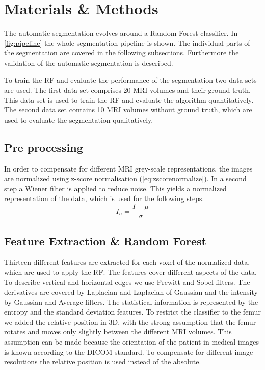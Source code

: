 \section{Materials \& Methods}
The automatic segmentation evolves around a Random Forest classifier. In \autoref{fig:pipeline} the whole segmentation pipeline is shown. The individual parts of the segmentation are covered in the following subsections. Furthermore the validation of the automatic segmentation is described.

To train the RF and evaluate the performance of the segmentation two data sets are used. The first data set comprises 20 MRI volumes and their ground truth. This data set is used to train the RF and evaluate the algorithm quantitatively. The second data set contains 10 MRI volumes without ground truth, which are used to evaluate the segmentation qualitatively.
\subsection{Pre processing}
In order to compensate for different MRI grey-scale representations, the images are normalized using z-score normalisation (\autoref{eq:zscorenormalize}). In a second step a Wiener filter is applied to reduce noise. This yields a normalized representation of the data, which is used for the following steps.
\begin{equation}
I_n = \frac{I - \mu}{\sigma}
\label{eq:zscorenormalize}
\end{equation}
\subsection{Feature Extraction \& Random Forest}
Thirteen different features are extracted for each voxel of the normalized data, which are used to apply the RF. The features cover different aspects of the data. To describe vertical and horizontal edges we use Prewitt and Sobel filters. The derivatives are covered by Laplacian and Laplacian of Gaussian and the intensity by Gaussian and Average filters. The statistical information is represented by the entropy and the standard deviation features. To restrict the classifier to the femur we added the relative position in 3D, with the strong assumption that the femur rotates and moves only slightly between the different MRI volumes. This assumption can be made because the orientation of the patient in medical images is known according to the DICOM standard\cite{dicom-orientation}. To compensate for different image resolutions the relative position is used instead of the absolute.

